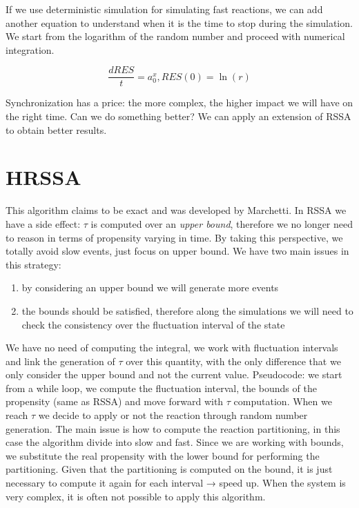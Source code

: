 If we use deterministic simulation for simulating fast reactions, we can add another equation to understand when it is the time to stop during the simulation.
We start from the logarithm of the random number and proceed with numerical integration.

$$\frac{dRES}{t}= a_0^x,RES(0)= \ln(r)$$

Synchronization has a price: the more complex, the higher impact we will have on the right time.
Can we do something better? We can apply an extension of RSSA to obtain better results.

\section{HRSSA}
This algorithm claims to be exact and was developed by Marchetti.
In RSSA we have a side effect: $\tau$ is computed over an \emph{upper bound}, therefore we no longer need to reason in terms of propensity varying in time.
By taking this perspective, we totally avoid slow events, just focus on upper bound.
We have two main issues in this strategy:

\begin{enumerate}
  \def\labelenumi{\arabic{enumi}.}
  \item by considering an upper bound we will generate more events
  \item the bounds should be satisfied, therefore along the simulations we will need to check the consistency over the fluctuation interval of the state
\end{enumerate}

We have no need of computing the integral, we work with fluctuation intervals and link the generation of $\tau$ over this quantity, with the only difference that we only consider the upper bound and not the current value.
Pseudocode: we start from a while loop, we compute the fluctuation interval, the bounds of the propensity (same as RSSA) and move forward with $\tau$ computation.
When we reach $\tau$ we decide to apply or not the reaction through random number generation.
The main issue is how to compute the reaction partitioning, in this case the algorithm divide into slow and fast.
Since we are working with bounds, we substitute the real propensity with the lower bound for performing the partitioning.
Given that the partitioning is computed on the bound, it is just necessary to compute it again for each interval → speed up.
When the system is very complex, it is often not possible to apply this algorithm.

